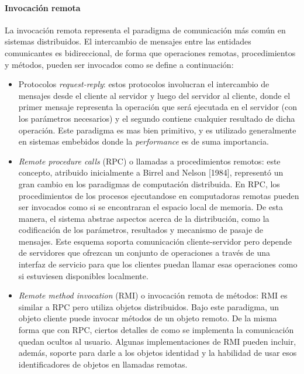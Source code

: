 \documentclass[a4paper,10pt, oneside]{article}
\begin{document}
\paragraph{Invocación remota}
La invocación remota representa el paradigma de comunicación más común en sistemas distribuidos. El intercambio de mensajes entre las entidades comunicantes es bidireccional, de forma que operaciones remotas, procedimientos y métodos, pueden ser invocados como se define a continuación:
\begin{itemize}
	\item Protocolos \textit{request-reply}: estos protocolos involucran el intercambio de mensajes desde el cliente al servidor y luego del servidor al cliente, donde el primer mensaje representa la operación que será ejecutada en el servidor (con los parámetros necesarios) y el segundo contiene cualquier resultado de dicha operación. Este paradigma es mas bien primitivo, y es utilizado generalmente en sistemas embebidos donde la \textit{performance} es de suma importancia.
	\item \textit{Remote procedure calls} (RPC) o llamadas a procedimientos remotos: este concepto, atribuido inicialmente a Birrel and Nelson [1984], representó un gran cambio en los paradigmas de computación distribuida. En RPC, los procedimientos de los procesos ejecutandose en computadoras remotas pueden ser invocados como si se encontraran el espacio local de memoria. De esta manera, el sistema abstrae aspectos acerca de la distribución, como la codificación de los parámetros, resultados y mecanismo de pasaje de  mensajes. Este esquema soporta comunicación cliente-servidor pero depende de servidores que ofrezcan un conjunto de operaciones a través de una interfaz de servicio para que los clientes puedan llamar esas operaciones como si estuviesen disponibles localmente.
	\item \textit{Remote method invocation} (RMI) o invocación remota de métodos: RMI es similar a RPC pero utiliza objetos distribuidos. Bajo este paradigma, un objeto cliente puede invocar métodos de un objeto remoto. De la misma forma que con RPC, ciertos detalles de como se implementa la comunicación quedan ocultos al usuario. Algunas implementaciones de RMI pueden incluir, además, soporte para darle a los objetos identidad y la habilidad de usar esos identificadores de objetos en llamadas remotas.
\end{itemize}
\end{document}
